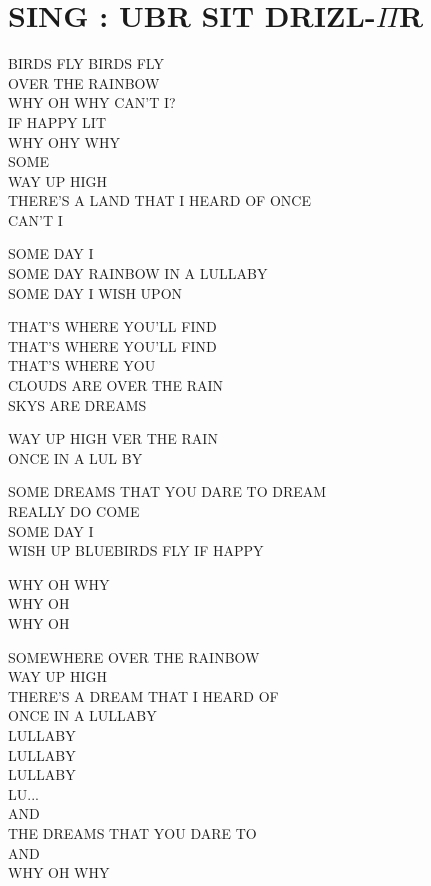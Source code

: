 \begin{comment}
\begin{tabular}{|p{3.7cm}|p{3.7cm}|p{3.7cm}|}\hline
SING&SONG&CHANSON\\\hline
\large{\textbf{Ubr sit Drizl-$\pi$r}} &
\large{\textbf{Par-delà l'arc-en-ciel}} &
\large{\textbf{Over the Rainbow}}
\end{tabular}\par
\end{comment}
\section*{SING : UBR SIT DRIZL-$\Pi$R}
BIRDS FLY BIRDS FLY\\
OVER THE RAINBOW\\
WHY OH WHY CAN'T I?\\
IF HAPPY LIT\\
WHY OHY WHY\\
SOME\\
WAY UP HIGH\\
THERE'S A LAND THAT I HEARD OF ONCE\\
CAN'T I\par

SOME DAY I\\
SOME DAY RAINBOW IN A LULLABY\\
SOME DAY I WISH UPON\par

THAT'S WHERE YOU'LL FIND\\
THAT'S WHERE YOU'LL FIND\\
THAT'S WHERE YOU\\
CLOUDS ARE OVER THE RAIN\\
SKYS ARE DREAMS\par

WAY UP HIGH VER THE RAIN\\
ONCE IN A LUL BY\par

SOME DREAMS THAT YOU DARE TO DREAM\\
REALLY DO COME\\
SOME DAY I\\
WISH UP BLUEBIRDS FLY IF HAPPY\par

WHY OH WHY\\
WHY OH\\
WHY OH\par

SOMEWHERE OVER THE RAINBOW\\
WAY UP HIGH\\
THERE'S A DREAM THAT I HEARD OF\\
ONCE IN A LULLABY\\
LULLABY\\
LULLABY\\
LULLABY\\
LU...\\
AND\\
THE DREAMS THAT YOU DARE TO\\
AND\\
WHY OH WHY\par

